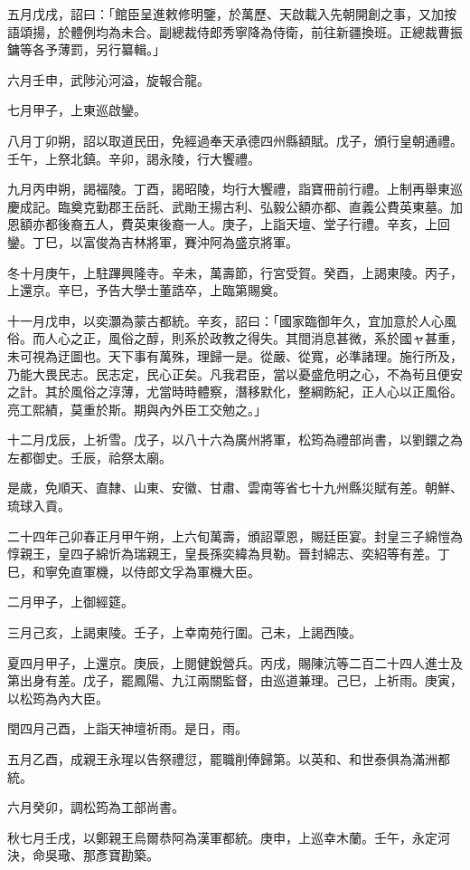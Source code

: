 \begin{pinyinscope}
五月戊戌，詔曰：「館臣呈進敕修明鑒，於萬歷、天啟載入先朝開創之事，又加按語頌揚，於體例均為未合。副總裁侍郎秀寧降為侍衛，前往新疆換班。正總裁曹振鏞等各予薄罰，另行纂輯。」

六月壬申，武陟沁河溢，旋報合龍。

七月甲子，上東巡啟鑾。

八月丁卯朔，詔以取道民田，免經過奉天承德四州縣額賦。戊子，頒行皇朝通禮。壬午，上祭北鎮。辛卯，謁永陵，行大饗禮。

九月丙申朔，謁福陵。丁酉，謁昭陵，均行大饗禮，詣寶冊前行禮。上制再舉東巡慶成記。臨奠克勤郡王岳託、武勛王揚古利、弘毅公額亦都、直義公費英東墓。加恩額亦都後裔五人，費英東後裔一人。庚子，上詣天壇、堂子行禮。辛亥，上回鑾。丁巳，以富俊為吉林將軍，賽沖阿為盛京將軍。

冬十月庚午，上駐蹕興隆寺。辛未，萬壽節，行宮受賀。癸酉，上謁東陵。丙子，上還京。辛巳，予告大學士董誥卒，上臨第賜奠。

十一月戊申，以奕灝為蒙古都統。辛亥，詔曰：「國家臨御年久，宜加意於人心風俗。而人心之正，風俗之醇，則系於政教之得失。其間消息甚微，系於國ャ甚重，未可視為迂圖也。天下事有萬殊，理歸一是。從嚴、從寬，必準諸理。施行所及，乃能大畏民志。民志定，民心正矣。凡我君臣，當以憂盛危明之心，不為茍且便安之計。其於風俗之淳薄，尤當時時體察，潛移默化，整綱飭紀，正人心以正風俗。亮工熙績，莫重於斯。期與內外臣工交勉之。」

十二月戊辰，上祈雪。戊子，以八十六為廣州將軍，松筠為禮部尚書，以劉鐶之為左都御史。壬辰，祫祭太廟。

是歲，免順天、直隸、山東、安徽、甘肅、雲南等省七十九州縣災賦有差。朝鮮、琉球入貢。

二十四年己卯春正月甲午朔，上六旬萬壽，頒詔覃恩，賜廷臣宴。封皇三子綿愷為惇親王，皇四子綿忻為瑞親王，皇長孫奕緯為貝勒。晉封綿志、奕紹等有差。丁巳，和寧免直軍機，以侍郎文孚為軍機大臣。

二月甲子，上御經筵。

三月己亥，上謁東陵。壬子，上幸南苑行圍。己未，上謁西陵。

夏四月甲子，上還京。庚辰，上閱健銳營兵。丙戌，賜陳沆等二百二十四人進士及第出身有差。戊子，罷鳳陽、九江兩關監督，由巡道兼理。己巳，上祈雨。庚寅，以松筠為內大臣。

閏四月己酉，上詣天神壇祈雨。是日，雨。

五月乙酉，成親王永瑆以告祭禮愆，罷職削俸歸第。以英和、和世泰俱為滿洲都統。

六月癸卯，調松筠為工部尚書。

秋七月壬戌，以鄭親王烏爾恭阿為漢軍都統。庚申，上巡幸木蘭。壬午，永定河決，命吳璥、那彥寶勘築。


\end{pinyinscope}
